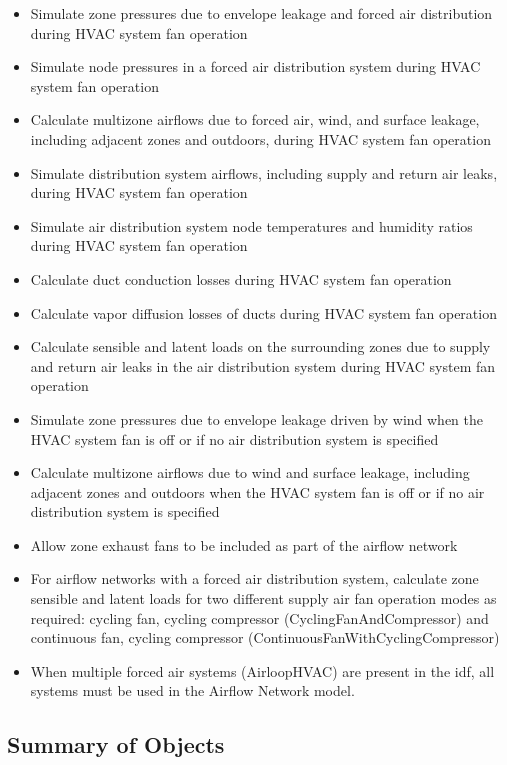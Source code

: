 \begin{itemize}
\item
  Simulate zone pressures due to envelope leakage and forced air distribution during HVAC system fan operation
\item
  Simulate node pressures in a forced air distribution system during HVAC system fan operation
\item
  Calculate multizone airflows due to forced air, wind, and surface leakage, including adjacent zones and outdoors, during HVAC system fan operation
\item
  Simulate distribution system airflows, including supply and return air leaks, during HVAC system fan operation
\item
  Simulate air distribution system node temperatures and humidity ratios during HVAC system fan operation
\item
  Calculate duct conduction losses during HVAC system fan operation
\item
  Calculate vapor diffusion losses of ducts during HVAC system fan operation
\item
  Calculate sensible and latent loads on the surrounding zones due to supply and return air leaks in the air distribution system during HVAC system fan operation
\item
  Simulate zone pressures due to envelope leakage driven by wind when the HVAC system fan is off or if no air distribution system is specified
\item
  Calculate multizone airflows due to wind and surface leakage, including adjacent zones and outdoors when the HVAC system fan is off or if no air distribution system is specified
\item
  Allow zone exhaust fans to be included as part of the airflow network
\item
  For airflow networks with a forced air distribution system, calculate zone sensible and latent loads for two different supply air fan operation modes as required: cycling fan, cycling compressor (CyclingFanAndCompressor) and continuous fan, cycling compressor (ContinuousFanWithCyclingCompressor)
\item
  When multiple forced air systems (AirloopHVAC) are present in the idf, all systems must be used in the Airflow Network model.
\end{itemize}

\subsection{Summary of Objects}\label{summary-of-objects}


